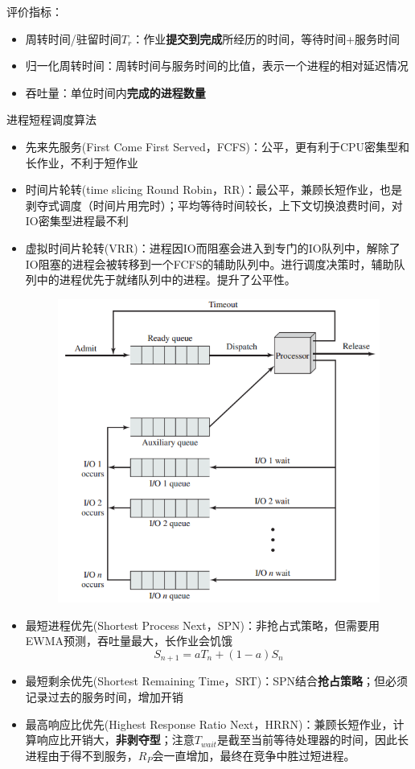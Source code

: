 评价指标：
\begin{itemize}
\item 周转时间/驻留时间$T_r$：作业\textbf{提交到完成}所经历的时间，等待时间+服务时间
\item 归一化周转时间：周转时间与服务时间的比值，表示一个进程的相对延迟情况
\item 吞吐量：单位时间内\textbf{完成的进程数量}
\end{itemize}

进程短程调度算法
\begin{itemize}
\item 先来先服务(First Come First Served，FCFS)：公平，更有利于CPU密集型和长作业，不利于短作业
\item 时间片轮转(time slicing Round Robin，RR)：最公平，兼顾长短作业，也是剥夺式调度（时间片用完时）；平均等待时间较长，上下文切换浪费时间，对IO密集型进程最不利
\item 虚拟时间片轮转(VRR)：进程因IO而阻塞会进入到专门的IO队列中，解除了IO阻塞的进程会被转移到一个FCFS的辅助队列中。进行调度决策时，辅助队列中的进程优先于就绪队列中的进程。提升了公平性。
\begin{figure}[H]
    \centering
    \includegraphics[width=0.6\linewidth]{fig/VRR.png}
\end{figure}
\item 最短进程优先(Shortest Process Next，SPN)：非抢占式策略，但需要用EWMA预测，吞吐量最大，长作业会饥饿
\[S_{n+1}=aT_n+(1-a)S_n\]
\item 最短剩余优先(Shortest Remaining Time，SRT)：SPN结合\textbf{抢占策略}；但必须记录过去的服务时间，增加开销
\item 最高响应比优先(Highest Response Ratio Next，HRRN)：兼顾长短作业，计算响应比开销大，\textbf{非剥夺型}；注意$T_{wait}$是截至当前等待处理器的时间，因此长进程由于得不到服务，$R_P$会一直增加，最终在竞争中胜过短进程。

\end{itemize}
